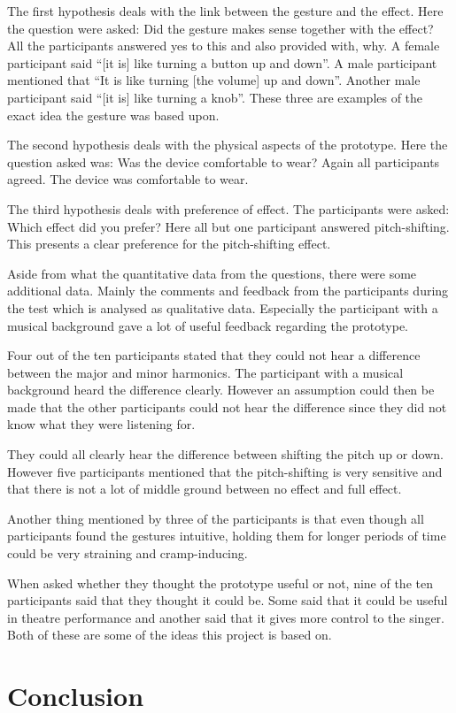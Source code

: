 The first hypothesis deals with the link between the gesture and the effect. Here the question were asked: Did the gesture makes sense together with the effect? All the participants answered yes to this and also provided with, why. A female participant said “[it is] like turning a button up and down”. A male participant mentioned that “It is like turning [the volume] up and down”. Another male participant said “[it is] like turning a knob”. These three are examples of the exact idea the gesture was based upon. 

The second hypothesis deals with the physical aspects of the prototype. Here the question asked was: Was the device comfortable to wear? Again all participants agreed. The device was comfortable to wear. 

The third hypothesis deals with preference of effect. The participants were asked: Which effect did you prefer? Here all but one participant answered pitch-shifting. This presents a clear preference for the pitch-shifting effect. 

Aside from what the quantitative data from the questions, there were some additional data. Mainly the comments and feedback from the participants during the test which is analysed as qualitative data. Especially the participant with a musical background gave a lot of useful feedback regarding the prototype. 

Four out of the ten participants stated that they could not hear a difference between the major and minor harmonics. The participant with a musical background heard the difference clearly. However an assumption could then be made that the other participants could not hear the difference since they did not know what they were listening for. 

They could all clearly hear the difference between shifting the pitch up or down. However five participants mentioned that the pitch-shifting is very sensitive and that there is not a lot of middle ground between no effect and full effect. 

Another thing mentioned by three of the participants is that even though all participants found the gestures intuitive, holding them for longer periods of time could be very straining and cramp-inducing. 

When asked whether they thought the prototype useful or not, nine of the ten participants said that they thought it could be. Some said that it could be useful in theatre performance and another said that it gives more control to the singer. Both of these are some of the ideas this project is based on. 

\section{Conclusion}